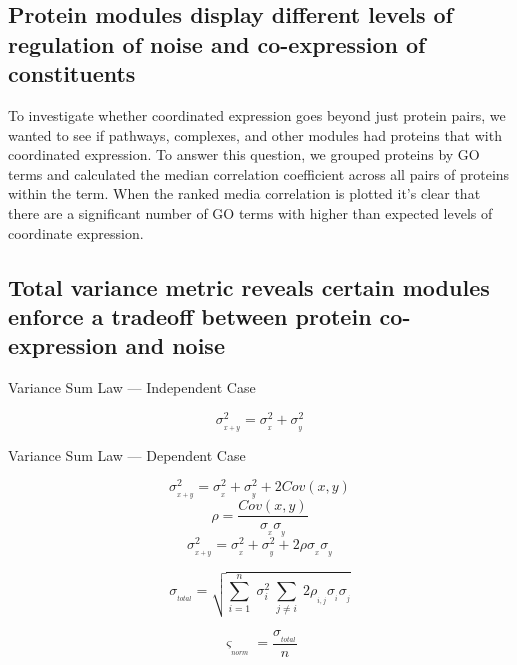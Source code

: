 \documentclass[11pt,]{article}
\begin{document}
\hypertarget{protein-modules-display-different-levels-of-regulation-of-noise-and-co-expression-of-constituents}{%
\subsection{Protein modules display different levels of regulation of
noise and co-expression of
constituents}\label{protein-modules-display-different-levels-of-regulation-of-noise-and-co-expression-of-constituents}}

To investigate whether coordinated expression goes beyond just protein
pairs, we wanted to see if pathways, complexes, and other modules had
proteins that with coordinated expression. To answer this question, we
grouped proteins by GO terms and calculated the median correlation
coefficient across all pairs of proteins within the term. When the
ranked media correlation is plotted it's clear that there are a
significant number of GO terms with higher than expected levels of
coordinate expression.

\hypertarget{total-variance-metric-reveals-certain-modules-enforce-a-tradeoff-between-protein-co-expression-and-noise}{%
\subsection{Total variance metric reveals certain modules enforce a
tradeoff between protein co-expression and
noise}\label{total-variance-metric-reveals-certain-modules-enforce-a-tradeoff-between-protein-co-expression-and-noise}}

Variance Sum Law --- Independent Case

\[\sigma_{_{x+y}}^2 = \sigma_{_{x}}^2 + \sigma_{_{y}}^2\]

Variance Sum Law --- Dependent Case

\[\sigma_{_{x+y}}^2 = \sigma_{_{x}}^2 + \sigma_{_{y}}^2 + 2Cov(x,y)\]
\[\rho = \dfrac{Cov(x,y)}{\sigma_{_{x}} \sigma_{_{y}}}\]
\[\sigma_{_{x+y}}^2 = \sigma_{_{x}}^2 + \sigma_{_{y}}^2 + 2\rho \sigma_{_{x}} \sigma_{_{y}}\]

\[\sigma_{{}_{total}} = \sqrt{\sum\limits_{i=1}^{n} \; \sigma_{i}^{2} \; \sum\limits_{j\neq i} \; 2\rho_{_{i,j}}\sigma_{_{i}}\sigma_{_{j}}}\]

\[\varsigma_{{}_{norm}} = \dfrac{\sigma_{{}_{total}}}{n}\]
\end{document}
